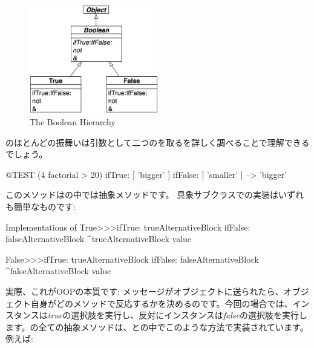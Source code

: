 \documentclass[a4paper,10pt,twoside]{book}
\begin{document}
\begin{figure}[ht]
  {\centerline {\includegraphics[width=0.5\textwidth]{BooleanHierarchy}}}
\caption{The Boolean Hierarchy }
\end{figure}

のほとんどの振舞いは引数として二つのを取るを詳しく調べることで理解できるでしょう。

\begin{code}{@TEST}
(4 factorial > 20) ifTrue: [ 'bigger' ] ifFalse: [ 'smaller' ] --> 'bigger'
\end{code}

このメソッドはの中では抽象メソッドです。
具象サブクラスでの実装はいずれも簡単なものです:

\begin{method}{Implementations of }
True>>>ifTrue: trueAlternativeBlock ifFalse: falseAlternativeBlock 
    ^trueAlternativeBlock value

False>>>ifTrue: trueAlternativeBlock ifFalse: falseAlternativeBlock 
    ^falseAlternativeBlock value
\end{method}

実際、これがOOPの本質です: メッセージがオブジェクトに送られたら、オブジェクト自身がどのメソッドで反応するかを決めるのです。今回の場合では、インスタンスは\emph{true}の選択肢を実行し、反対にインスタンスは\emph{false}の選択肢を実行します。の全ての抽象メソッドは、との中でこのような方法で実装されています。例えば:
\end{document}
